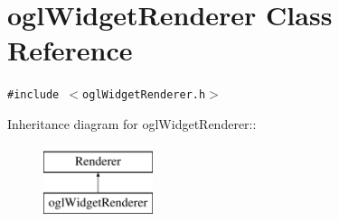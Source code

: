 \hypertarget{classogl_widget_renderer}{
\section{oglWidgetRenderer Class Reference}
\label{classogl_widget_renderer}
}
{\tt \#include $<$oglWidgetRenderer.h$>$}

Inheritance diagram for oglWidgetRenderer::\begin{figure}[H]
\begin{center}
\leavevmode
\includegraphics[height=2cm]{classogl_widget_renderer}
\end{center}
\end{figure}
